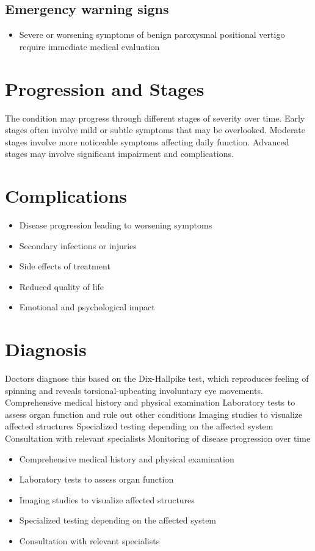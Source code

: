 \subsection{Emergency warning signs}
\begin{itemize}[noitemsep]
  \item Severe or worsening symptoms of benign paroxysmal positional vertigo require immediate medical evaluation
\end{itemize}
\section{Progression and Stages}
The condition may progress through different stages of severity over time. Early stages often involve mild or subtle symptoms that may be overlooked. Moderate stages involve more noticeable symptoms affecting daily function. Advanced stages may involve significant impairment and complications.
\section{Complications}
\begin{itemize}[noitemsep]
  \item Disease progression leading to worsening symptoms
  \item Secondary infections or injuries
  \item Side effects of treatment
  \item Reduced quality of life
  \item Emotional and psychological impact
\end{itemize}
\section{Diagnosis}
Doctors diagnose this based on the Dix-Hallpike test, which reproduces feeling of spinning and reveals torsional-upbeating involuntary eye movements. Comprehensive medical history and physical examination Laboratory tests to assess organ function and rule out other conditions Imaging studies to visualize affected structures Specialized testing depending on the affected system Consultation with relevant specialists Monitoring of disease progression over time

\begin{itemize}[noitemsep]
  \item Comprehensive medical history and physical examination
  \item Laboratory tests to assess organ function
  \item Imaging studies to visualize affected structures
  \item Specialized testing depending on the affected system
  \item Consultation with relevant specialists
\end{itemize}
